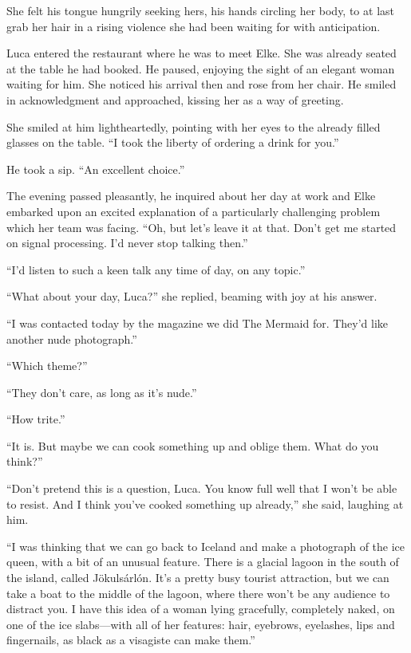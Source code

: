 She felt his tongue hungrily seeking hers, his hands circling her body, to at last grab her hair in a rising violence she had been waiting for with anticipation.

\sectionline

Luca entered the restaurant where he was to meet Elke. She was already seated at the table he had booked. He paused, enjoying the sight of an elegant woman waiting for him. She noticed his arrival then and rose from her chair. He smiled in acknowledgment and approached, kissing her as a way of greeting.

She smiled at him lightheartedly, pointing with her eyes to the already filled glasses on the table. ``I took the liberty of ordering a drink for you.''

He took a sip. ``An excellent choice.''

The evening passed pleasantly, he inquired about her day at work and Elke embarked upon an excited explanation of a particularly challenging problem which her team was facing. ``Oh, but let's leave it at that. Don't get me started on signal processing. I'd never stop talking then.''

``I'd listen to such a keen talk any time of day, on any topic.''

``What about your day, Luca?'' she replied, beaming with joy at his answer.

``I was contacted today by the magazine we did The Mermaid for. They'd like another nude photograph.''

``Which theme?''

``They don't care, as long as it's nude.''

``How trite.''

``It is. But maybe we can cook something up and oblige them. What do you think?''

``Don't pretend this is a question, Luca. You know full well that I won't be able to resist. And I think you've cooked something up already,'' she said, laughing at him.

``I was thinking that we can go back to Iceland and make a photograph of the ice queen, with a bit of an unusual feature. There is a glacial lagoon in the south of the island, called Jökulsárlón. It's a pretty busy tourist attraction, but we can take a boat to the middle of the lagoon, where there won't be any audience to distract you. I have this idea of a woman lying gracefully, completely naked, on one of the ice slabs---with all of her features: hair, eyebrows, eyelashes, lips and fingernails, as black as a visagiste can make them.''

